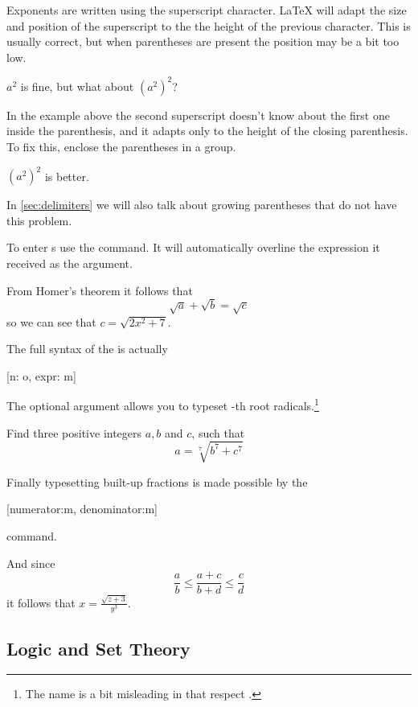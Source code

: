 Exponents are written using the superscript \ai{\^{}}
character. \LaTeX{} will adapt the size and position of the superscript to the
the height of the previous character. This is usually correct, but when
parentheses are present the position may be a bit too low.
\begin{example}
\( a^2 \) is fine, but what
about \( (a^2)^2 \)?
\end{example}
In the example above the second superscript doesn't know about the first one
inside the parenthesis, and it adapts only to the height of the closing
parenthesis. To fix this, enclose the parentheses in a group.
\begin{example}
\( {(a^2)}^2 \) is better.
\end{example}
In \autoref{sec:delimiters} we will also talk about growing parentheses that do
not have this problem.

To enter s use the  command. It will automatically
overline the expression it received as the argument.
\begin{example}
From Homer's theorem it 
follows that
\[
  \sqrt{a} + \sqrt{b} = \sqrt{c}
\]
so we can see that
\(c = \sqrt{2x^2+7}\).
\end{example}
The full syntax of the  is actually
\begin{lscommand}
  [n: o, expr: m]
\end{lscommand}
The optional argument  allows you to typeset -th root
radicals.\footnote{The name  is a bit misleading in that respect
  \smiley.}
\begin{example}
Find three positive integers
\(a, b\) and \(c\), such that
\[
  a = \sqrt[7]{b^7 + c^7}
\]
\end{example}

Finally typesetting built-up fractions is made possible by the
\begin{lscommand}
  [numerator:m, denominator:m]
\end{lscommand}
command.
\begin{example}
And since
\[
  \frac{a}{b} \leq
  \frac{a+c}{b+d} \leq
  \frac{c}{d}
\]
it follows that
\(x = \frac{\sqrt{z+3}}{y^3}\).
\end{example}

\subsection{Logic and Set Theory}

